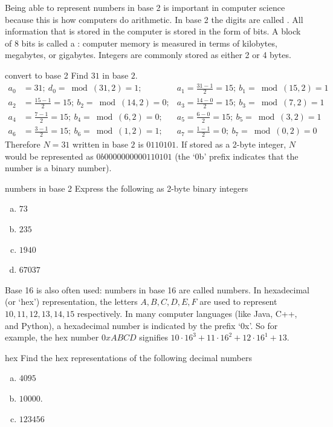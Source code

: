 Being able to represent numbers in base 2 is  important in computer science because this is how computers do arithmetic.  In base 2 the digits are called . All information that is stored in the computer is stored in the form of bits. A block of 8 bits is called a : computer memory is measured in terms of kilobytes, megabytes, or gigabytes. Integers are commonly stored as either 2 or 4 bytes.

\begin{example}{convert to base 2}
Find  $31$ in base $2$.
\begin{align*}
a_{0}&=31;~d_{0}=\bmod(31,2)=1;&a_{1}=\frac{31-1}{2}=15;~b_{1}=\bmod(15,2)=1\\
a_{2}&=\frac{15-1}{2}=15;~b_{2}=\bmod(14,2)=0;&a_{3}=\frac{14-0}{2}=15;~b_{3}=\bmod(7,2)=1\\
a_{4}&=\frac{7-1}{2}=15;~b_{4}=\bmod(6,2)=0;&a_{5}=\frac{6-0}{2}=15;~b_{5}=\bmod(3,2)=1\\
a_{6}&=\frac{3-1}{2}=15;~b_{6}=\bmod(1,2)=1;&a_{7}=\frac{1-1}{2}=0;~b_{7}=\bmod(0,2)=0
\end{align*}
Therefore $N=31$ written in base $2$ is $0110101$. If stored as a 2-byte integer, $N$ would be represented as $0b0000000000110101$  (the `0b' prefix indicates that the number is a binary number).
\end{example}
\begin{exercise}{numbers in base 2}
Express the following as 2-byte binary integers
\begin{enumerate}[(a)]
\item $73$
\item $235$
\item $1940$
\item $67037$
\end{enumerate} 
\end{exercise}

Base 16 is also often used: 
numbers in base 16 are called  numbers.  In hexadecimal (or `hex') representation, the letters $A,B,C,D,E,F$ are used to represent $10, 11, 12, 13,14, 15$ respectively.
In many computer languages (like Java, C++, and Python), a hexadecimal number is indicated by the prefix `0x'.  So for example, the hex number $0xABCD$ signifies
$10\cdot 16^3 + 11 \cdot 16^2 + 12 \cdot 16^1 + 13$.

\begin{exercise}{hex}
Find the hex representations of the following decimal numbers
\begin{enumerate}[(a)]
\item $4095$
\item $10000$.
\item $123456$
\end{enumerate}
\end{exercise}

